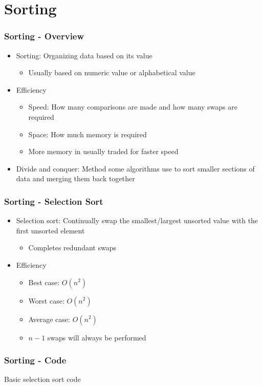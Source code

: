 \section{Sorting}
\begin{frame}\frametitle{Sorting - Overview}
\begin{itemize}
\item Sorting: Organizing data based on its value
	\begin{itemize}
	\item Usually based on numeric value or alphabetical value
	\end{itemize}
\item Efficiency
	\begin{itemize}
	\item Speed: How many comparisons are made and how many swaps are required
	\item Space: How much memory is required
	\item More memory in usually traded for faster speed
	\end{itemize}
\item Divide and conquer: Method some algorithms use to sort smaller sections of data and merging them back together
\end{itemize}
\end{frame}

\begin{frame}\frametitle{Sorting - Selection Sort}
\begin{itemize}
\item Selection sort: Continually swap the smallest/largest unsorted value with the first unsorted element
	\begin{itemize}
	\item Completes redundant swaps
	\end{itemize}
\item Efficiency
	\begin{itemize}
	\item Best case: $O(n^2)$
	\item Worst case: $O(n^2)$
	\item Average case: $O(n^2)$
	\item $n - 1$ swaps will always be performed
	\end{itemize}
\end{itemize}
\end{frame}

\begin{frame}\frametitle{Sorting - Code}
Basic selection sort code

\end{frame}

